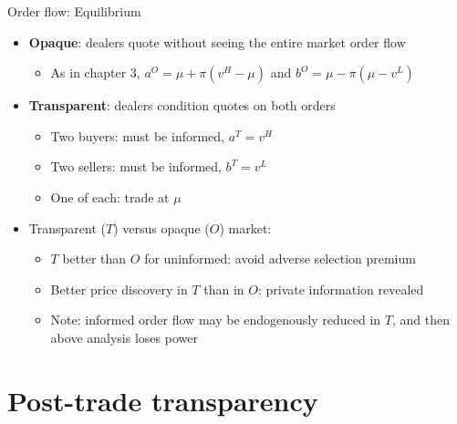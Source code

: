 \documentclass[english,10pt
,aspectratio=169
]{beamer}
\begin{document}
\begin{frame}{Order flow: Equilibrium}
	\begin{itemize}
		\item \textbf{Opaque}: dealers quote without seeing the entire market order flow
		\begin{itemize}
			\item As in chapter 3, $a^{O}=\mu+\pi(v^{H}-\mu)$ and $b^{O}=\mu-\pi(\mu-v^{L})$
		\end{itemize}
		\item \textbf{Transparent}: dealers condition quotes on both orders
		\begin{itemize}
			\item Two buyers: must be informed, $a^{T}=v^{H}$
			\item Two sellers: must be informed, $b^{T}=v^{L}$
			\item One of each: trade at $\mu$
		\end{itemize}
		\item Transparent ($T$) versus opaque ($O$) market:
		\begin{itemize}
			\item $T$ better than $O$ for uninformed: avoid adverse selection premium
			\item Better price discovery in $T$ than in $O$:  private information revealed
			\item Note: informed order flow may be endogenously reduced in $T$, and then above analysis loses power
		\end{itemize}
	\end{itemize}
\end{frame}



\section{Post-trade transparency}
\end{document}

